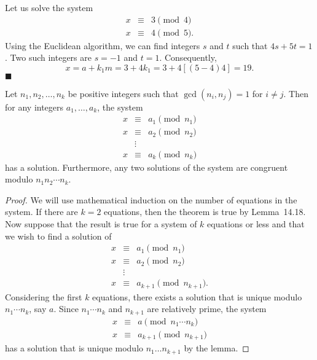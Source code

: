  
\vspace{2ex}
 
 
Let us solve the system
\begin{eqnarray*}
x & \equiv & 3 \pmod{4} \\
x & \equiv & 4 \pmod{5}. 
\end{eqnarray*}
Using the Euclidean algorithm, we can find integers $s$ and $t$ such
that $4s + 5t =1$. Two such integers are $s = -1$ and $t = 1$.
Consequently,
\[
x = a + k_1 m = 3 + 4k_1 = 3 + 4[(5-4)4] = 19.
\]
\hspace{\fill} $\blacksquare$
 
 
\begin{theorem}
Let $n_1, n_2, \ldots, n_k$ be positive integers such that $\gcd(n_i, n_j)
= 1$ for $i \neq j$. Then for any integers $a_1, \ldots, a_k$, the
system
\begin{eqnarray*}
x & \equiv & a_1 \pmod{n_1} \\
x & \equiv & a_2 \pmod{n_2} \\
  & \vdots & \\
x & \equiv & a_k \pmod{n_k}
\end{eqnarray*}
has a solution.  Furthermore, any two solutions of the system are
congruent modulo $n_1 n_2 \cdots n_k$.
\end{theorem}
 
\begin{proof}
We will use mathematical induction on the number of equations in the
system. If there are $k= 2$ equations, then the theorem is true by 
Lemma~14.18. Now suppose that the result is true for a system of $k$ 
equations or less and that we wish to find a solution of 
\begin{eqnarray*}
x & \equiv & a_1 \pmod{n_1} \\
x & \equiv & a_2 \pmod{n_2} \\
  & \vdots & \\
x & \equiv & a_{k+1} \pmod{n_{k+1}}.
\end{eqnarray*}
Considering the first $k$ equations, there exists a solution that is
unique modulo $n_1 \cdots n_k$, say $a$. Since $n_1 \cdots n_k$ and
$n_{k+1}$ are relatively prime, the system 
\begin{eqnarray*}
x & \equiv & a \pmod{n_1 \cdots n_k } \\
x & \equiv & a_{k+1} \pmod{n_{k+1}}
\end{eqnarray*}
has a solution that is unique modulo $n_1 \ldots n_{k+1}$ by the
lemma.
\end{proof}
 
